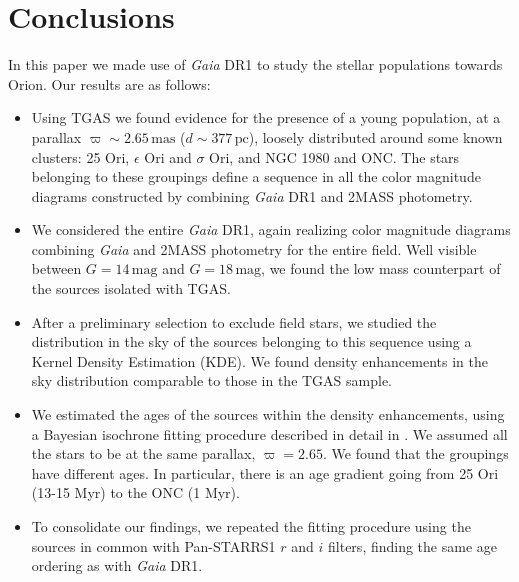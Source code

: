 \documentclass[onecolumn]{aa} %
\begin{document}
\section{Conclusions}
In this paper we made use of  \textit{Gaia} DR1 \citep{Brown2016, Prusti2016, vanLeeuwen2017} to study the stellar populations towards Orion. Our results are as follows:

\begin{itemize}
\item Using TGAS \citep{Michalik2015, Lindegren2016} we found evidence for the presence of a young population, at a parallax $\varpi \sim 2.65 \, \mathrm{mas}$  ($d \sim 377 \, \mathrm{pc}$), loosely distributed around some known clusters: 25 Ori, $\epsilon$ Ori and $\sigma$ Ori, and  NGC 1980 and ONC. The stars belonging to these groupings define a sequence in all the color magnitude diagrams constructed by combining \textit{Gaia} DR1 and 2MASS photometry.
\item We considered the entire \textit{Gaia} DR1, again realizing color magnitude diagrams combining \textit{Gaia} and 2MASS photometry for the entire field. Well visible between $G = 14 \, \mathrm{mag}$  and $G = 18 \, \mathrm{mag}$, we found the low mass counterpart of the sources isolated with TGAS. 
\item After a preliminary selection to exclude field stars, we studied the distribution in the sky of the sources belonging to this sequence using a Kernel Density Estimation (KDE). We found  density enhancements in the sky distribution comparable to those in the TGAS sample.
\item We estimated the ages of the sources within the density enhancements, using  a Bayesian isochrone fitting procedure described in detail in \cite{Jorgensen2005}. We  assumed all the stars to be at the same parallax, $\varpi = 2.65$. We found that the groupings have different ages. In particular, there is an age gradient going from 25 Ori (13-15 Myr) to the ONC (1 Myr).
 \item To consolidate our findings, we repeated the fitting procedure using the sources in common with Pan-STARRS1 \citep{Chambers2016, Magnier2016} $r$ and $i$ filters, finding the same age ordering as with \textit{Gaia} DR1. 
 

\end{itemize}
\end{document}
